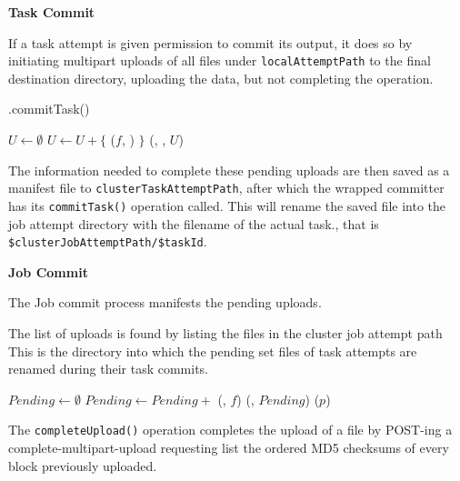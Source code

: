 \documentclass[conference]{IEEEtran}
\begin{document}
\textbf{Task Commit}

If a task attempt is given permission to commit its output, it does
so by initiating multipart uploads of all files under \texttt{localAttemptPath}
to the final destination directory, uploading the data, but not completing
the operation.

\begin{procedure}
\StagingVars

  \wrappedCommitter.commitTask()\;

  $U \longleftarrow \emptyset$\;
   {
    $U \longleftarrow U + \{$ \uploadFileToPendingCommit($f$, \dest) $\}$\;
  }
  \savePendingSet(\clusterfs, \clusterTaskAttemptPath, $U$)\;

\caption{StagingCommitter.commitTask()}
\label{alg:StagingCommitter.commitTask}

\end{procedure}

The information needed to complete these pending uploads are then saved as
a manifest file to \texttt{clusterTaskAttemptPath}, after which the wrapped committer has
its \texttt{commitTask()} operation called.
This will rename the saved file into the job attempt directory with the
filename of the actual task., that is \texttt{\$clusterJobAttemptPath/\$taskId}.


\textbf{Job Commit}

The Job commit process manifests the pending uploads.

The list of uploads is found by listing the files in the cluster job attempt path
This is the directory into which the pending set files of task attempts are
renamed during their task commits.

\begin{procedure}
\StagingVars

  $Pending \longleftarrow \emptyset$\;
   {
    $Pending \longleftarrow Pending + $ \loadPendingSet(\clusterfs, $f$)\;
  }
  \checkForConflicts(\fs, $Pending$) \;
   {
    \completeUpload($p$)\;
  }

\caption{StagingCommitter.commitJob()}
\label{alg:StagingCommitter.commitJob}
\end{procedure}

The \texttt{completeUpload()} operation completes the upload of a file by POST-ing
a complete-multipart-upload requesting list the ordered MD5 checksums of every block
previously uploaded.
\end{document}
